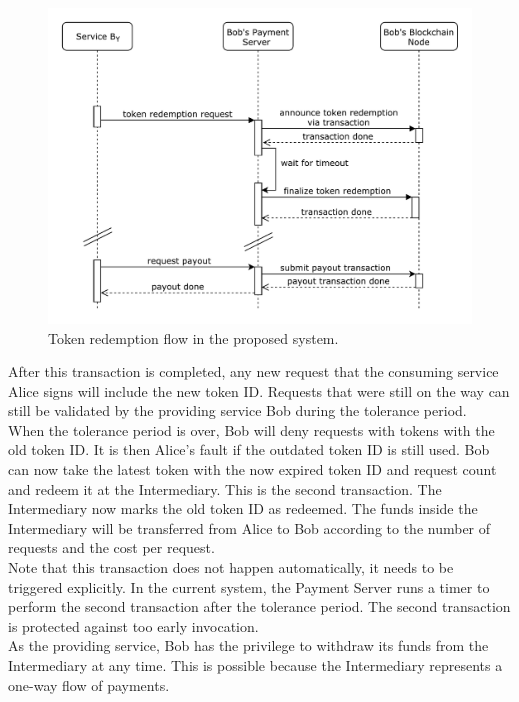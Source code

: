 \documentclass[a4paper,12pt]{scrartcl}
\begin{document}
\begin{figure}[H]
\centering
\includegraphics[width=450pt]{Images/TokenRedemption.pdf}
\caption{Token redemption flow in the proposed system.}
\label{fig:TokenRedemption}
\end{figure}

After this transaction is completed, any new request that the consuming service Alice signs will include the new token ID. Requests that were still on the way can still be validated by the providing service Bob during the tolerance period.\\

When the tolerance period is over, Bob will deny requests with tokens with the old token ID. It is then Alice's fault if the outdated token ID is still used. Bob can now take the latest token with the now expired token ID and request count and redeem it at the Intermediary. This is the second transaction. The Intermediary now marks the old token ID as redeemed. The funds inside the Intermediary will be transferred from Alice to Bob according to the number of requests and the cost per request.\\
Note that this transaction does not happen automatically, it needs to be triggered explicitly. In the current system, the Payment Server runs a timer to perform the second transaction after the tolerance period. The second transaction is protected against too early invocation.\\

As the providing service, Bob has the privilege to withdraw its funds from the Intermediary at any time. This is possible because the Intermediary represents a one-way flow of payments.\\
\end{document}
